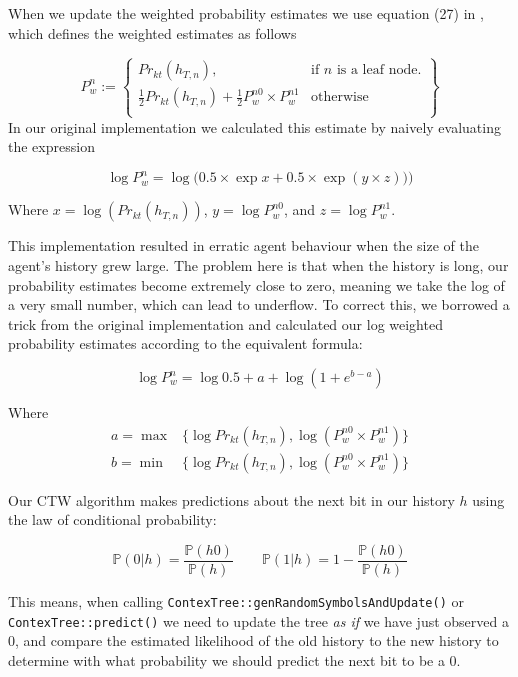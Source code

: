 \documentclass{article}
\begin{document}
\begin{flushleft}
When we update the weighted probability estimates we use equation (27) in \cite{orig}, which defines the weighted estimates as follows

  \[
    P_w ^n := \left\{\begin{array}{lr}
        Pr_{kt}(h_{T, n}), & \textrm{if } n \textrm{ is a leaf node.}\\
        \frac{1}{2}Pr_{kt}(h_{T, n}) + \frac{1}{2}P^{n0}_w \times P^{n1}_w & \textrm{otherwise } \\
        \end{array}\right\}
  \]
In our original implementation we calculated this estimate by naively evaluating the expression

\[
    \log P_w^n = \log \bigg( 0.5 \times \exp x + 0.5 \times \exp ( y \times z) ) \bigg)
\]

Where $x = \log (Pr_{kt}(h_{T, n}))$, $y = \log P^{n0}_w$, and $z = \log P^{n1}_w$. \newline

This implementation resulted in erratic agent behaviour when the size of the agent's history grew large. The problem here is that when the history is long, our probability estimates become extremely close to zero, meaning we take the log of a very small number, which can lead to underflow. To correct this, we borrowed a trick from the original implementation and calculated our log weighted probability estimates according to the equivalent formula:

$$
    \log P_w^n = \log 0.5 + a + \log (1 + e^{b - a})
$$

Where \begin{align*}
    a =  \max&\{ \log Pr_{kt}(h_{T, n}), \log (P^{n0}_w \times P^{n1}_w) \} \\
    b =  \min&\{ \log Pr_{kt}(h_{T, n}), \log (P^{n0}_w \times P^{n1}_w) \}
\end{align*}

Our CTW algorithm makes predictions about the next bit in our history $h$ using the law of conditional probability: 

\[
    \mathbb{P}(0 | h) = \dfrac{\mathbb{P}(h0)}{\mathbb{P}(h)} \qquad \mathbb{P}(1 | h) = 1 - \dfrac{\mathbb{P}(h0)}{\mathbb{P}(h)}
\]

This means, when calling \texttt{ContexTree::genRandomSymbolsAndUpdate()} or \texttt{ContexTree::predict()} we need to update the tree \textit{as if} we have just observed a $0$, and compare the estimated likelihood of the old history to the new history to determine with what probability we should predict the next bit to be a $0$. \newline


\end{flushleft}
\end{document}
